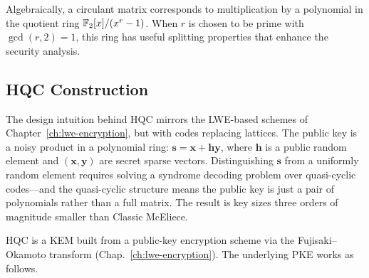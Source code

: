 Algebraically, a circulant matrix corresponds to multiplication by a polynomial in the quotient ring $\mathbb{F}_2[x]/(x^r - 1)$.  When $r$ is chosen to be prime with $\gcd(r, 2) = 1$, this ring has useful splitting properties that enhance the security analysis.


\subsection{HQC Construction}
\label{subsec:hqc-construction}

The design intuition behind HQC mirrors the LWE-based schemes of Chapter~\ref{ch:lwe-encryption}, but with codes replacing lattices.  The public key is a noisy product in a polynomial ring: $\mathbf{s} = \mathbf{x} + \mathbf{h}\mathbf{y}$, where $\mathbf{h}$ is a public random element and $(\mathbf{x}, \mathbf{y})$ are secret sparse vectors.  Distinguishing $\mathbf{s}$ from a uniformly random element requires solving a syndrome decoding problem over quasi-cyclic codes---and the quasi-cyclic structure means the public key is just a pair of polynomials rather than a full matrix.  The result is key sizes three orders of magnitude smaller than Classic McEliece.

HQC is a KEM built from a public-key encryption scheme via the Fujisaki--Okamoto transform (Chap.~\ref{ch:lwe-encryption}).  The underlying PKE works as follows.

